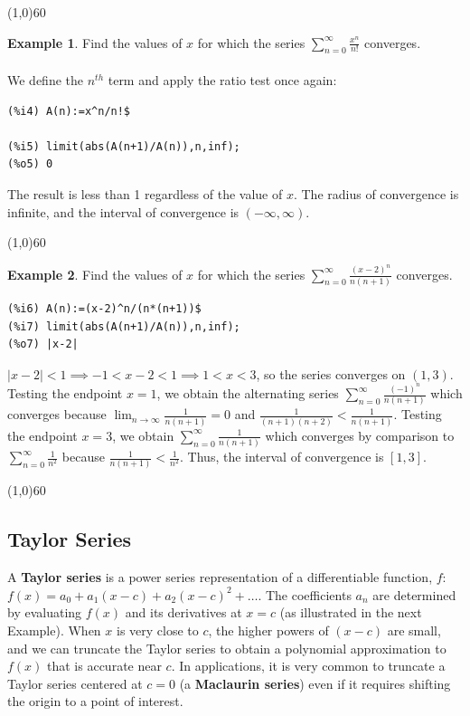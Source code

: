 \documentclass[10.5pt,twoside]{report}
\theoremstyle{definition}
\newtheorem{exmp}{Example}[section]
\begin{document}
\line(1,0){60}
\linethickness{0.5mm}


\begin{exmp} Find the values of $x$ for which the series $ \sum_{n=0}^{\infty} \frac{x^n}{n!}$ converges.\\
${}$\\
We define the $n^{th}$ term and apply the ratio test once again:

\begin{verbatim}
(%i4) A(n):=x^n/n!$

(%i5) limit(abs(A(n+1)/A(n)),n,inf);
(%o5) 0
\end{verbatim}

The result is less than 1 regardless of the value of $x$.  The radius of convergence is infinite, and the interval of convergence is $(-\infty,\infty)$.

\end{exmp}

\line(1,0){60}
\linethickness{0.5mm}


\begin{exmp} Find the values of $x$ for which the series $ \sum_{n=0}^{\infty} \frac{(x-2)^n}{n(n+1)}$ converges.\\

\begin{verbatim}
(%i6) A(n):=(x-2)^n/(n*(n+1))$
(%i7) limit(abs(A(n+1)/A(n)),n,inf);
(%o7) |x-2|
\end{verbatim}

$|x-2|<1 \implies -1<x-2<1 \implies 1<x<3$, so the series converges on $(1,3)$.  Testing the endpoint $x=1$, we obtain the alternating series $ \sum_{n=0}^{\infty} \frac{(-1)^n}{n(n+1)}$ which converges because $ \lim_{n\to \infty} \frac{1}{n(n+1)}=0$ and $ \frac{1}{(n+1)(n+2)}<\frac{1}{n(n+1)}$.  Testing the endpoint $x=3$, we obtain $ \sum_{n=0}^{\infty} \frac{1}{n(n+1)}$ which converges by comparison to $ \sum_{n=0}^{\infty} \frac{1}{n^2}$ because $ \frac{1}{n(n+1)}< \frac{1}{n^2}$.  Thus, the interval of convergence is $[1,3]$.

\end{exmp}

\line(1,0){60}
\linethickness{0.5mm}


\subsection{Taylor Series}

A \textbf{Taylor series} is a power series representation of a differentiable function, $f$:  $f(x)=a_0+a_1(x-c)+a_2(x-c)^2+\dots$.  The coefficients $a_n$ are determined by evaluating $f(x)$ and its derivatives at $x=c$ (as illustrated in the next Example).   When $x$ is very close to $c$, the higher powers of $(x-c)$ are small, and we can truncate the Taylor series to obtain a polynomial approximation to $f(x)$ that is accurate near $c$.  In applications, it is very common to truncate a Taylor series centered at $c=0$ (a \textbf{Maclaurin series}) even if it requires shifting the origin to a point of interest. \\
\end{document}
